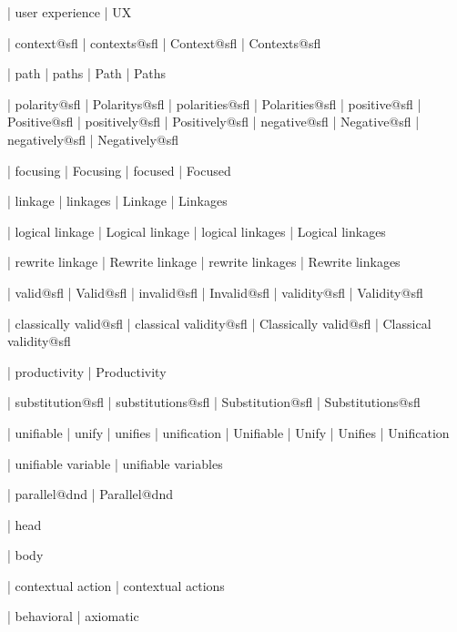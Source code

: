  | user experience
 | UX
 
 | context@sfl
 | contexts@sfl
 | Context@sfl
 | Contexts@sfl

 | path
 | paths
 | Path
 | Paths

 | polarity@sfl
 | Polaritys@sfl
 | polarities@sfl
 | Polarities@sfl
 | positive@sfl
 | Positive@sfl
 | positively@sfl
 | Positively@sfl
 | negative@sfl
 | Negative@sfl
 | negatively@sfl
 | Negatively@sfl

 | focusing
 | Focusing
 | focused
 | Focused

 | linkage
 | linkages
 | Linkage
 | Linkages

 | logical linkage
 | Logical linkage
 | logical linkages
 | Logical linkages

 | rewrite linkage
 | Rewrite linkage
 | rewrite linkages
 | Rewrite linkages

 | valid@sfl
 | Valid@sfl
 | invalid@sfl
 | Invalid@sfl
 | validity@sfl
 | Validity@sfl

 | classically valid@sfl
 | classical validity@sfl
 | Classically valid@sfl
 | Classical validity@sfl

 | productivity
 | Productivity
 
 | substitution@sfl
 | substitutions@sfl
 | Substitution@sfl
 | Substitutions@sfl

 | unifiable
 | unify
 | unifies
 | unification
 | Unifiable
 | Unify
 | Unifies
 | Unification

 | unifiable variable
 | unifiable variables

 | parallel@dnd
 | Parallel@dnd




 | head

 | body

 | contextual action
 | contextual actions
 
 | behavioral
 | axiomatic

